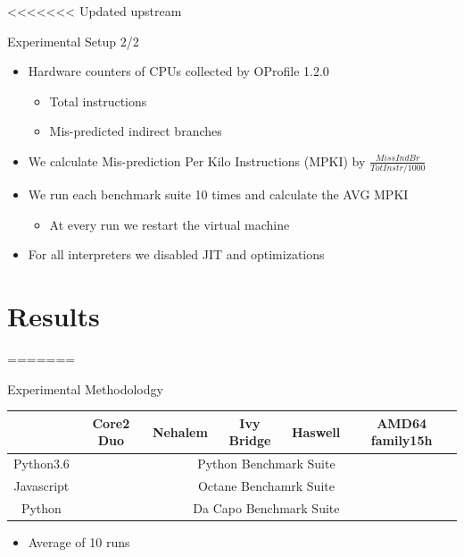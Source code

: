 \documentclass[10pt]{beamer}
\begin{document}
<<<<<<< Updated upstream
\begin{frame}{Experimental Setup 2/2}
	\begin{itemize}
		\item {Hardware counters of CPUs collected by OProfile 1.2.0}
			\begin{itemize}
				\item {Total instructions}
				\item {Mis-predicted indirect branches}
			\end{itemize}
		\item {We calculate Mis-prediction Per Kilo Instructions (MPKI) by} $\frac{MissIndBr}{TotInstr/1000} $%
		\item {We run each benchmark suite 10 times and calculate the AVG MPKI}
		\begin{itemize}
			\item {At every run we restart the virtual machine}
		\end{itemize}
		\item {For all interpreters we disabled JIT and optimizations}
		
	\end{itemize}
\end{frame}
\section{Results}
=======
\begin{frame}{Experimental Methodolodgy}
    \begin{table}
        \centering
        \begin{adjustbox}{width=1\textwidth}
            \begin{tabular}{|c|c|c|c|c|c|} 
                \hline
                &Core2 Duo  &Nehalem  &Ivy Bridge   &Haswell  &AMD64 family15h \\
                \hline 
                Python3.6   &\multicolumn{5}{c|}{Python Benchmark Suite} \\ 
                \hline
                Javascript  &\multicolumn{5}{c|}{Octane Benchamrk Suite}\\ 
                \hline
                Python      &\multicolumn{5}{c|}{Da Capo Benchmark Suite} \\ 
                \hline
            \end{tabular}
        \end{adjustbox}
    \end{table}

    \begin{itemize}
        \item{Average of 10 runs}
    \end{itemize}
\end{frame}
\end{document}
